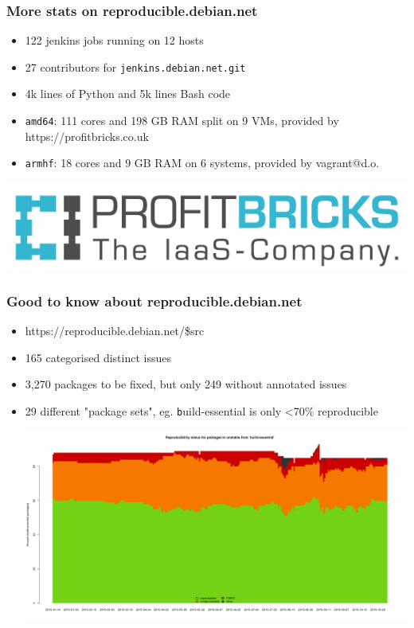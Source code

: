 \documentclass[14pt,aspectratio=169]{beamer}
\begin{document}
\begin{frame}
 \frametitle{More stats on reproducible.debian.net}

 \begin{itemize}
  \item 122 jenkins jobs running on 12 hosts
  \item 27 contributors for \texttt{jenkins.debian.net.git}
  \item 4k lines of Python and 5k lines Bash code
  \item \texttt{amd64}: 111 cores and 198 GB RAM split on 9 VMs, provided by
  https://profitbricks.co.uk
  \item \texttt{armhf}: 18 cores and 9 GB RAM on 6 systems, provided by vagrant@d.o.
 \end{itemize}
 \begin{center}
  \includegraphics[height=0.2\paperheight]{images/profitbricks_logo.png}
  \vfill
 \end{center}
\end{frame}

\begin{frame}
 \frametitle{Good to know about reproducible.debian.net}

 \begin{itemize}
  \item https://reproducible.debian.net/\$src
  \item<2-3> { 165 categorised distinct issues }
  \item<2-3> { 3,270 packages to be fixed, but only 249 without annotated
  issues }
  \item<3> { 29 different "package sets", eg. \texttt build-essential is only <70\%
  reproducible
   \begin{center}
    \includegraphics[height=0.5\paperheight]{images/stats_meta_pkg_state_build-essential.png}
   \vfill
 \end{center}
  }
 \end{itemize}
\end{frame}
\end{document}
